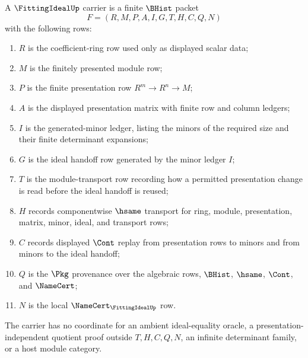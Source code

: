 \begin{definition}
\label{def:fitting-ideal-carrier}
A $\FittingIdealUp$ carrier is a finite $\BHist$ packet
$$
F=(R,M,P,A,I,G,T,H,C,Q,N)
$$
with the following rows:
\begin{enumerate}
\item $R$ is the coefficient-ring row used only as displayed scalar data;
\item $M$ is the finitely presented module row;
\item $P$ is the finite presentation row $R^{m}\to R^{n}\to M$;
\item $A$ is the displayed presentation matrix with finite row and column ledgers;
\item $I$ is the generated-minor ledger, listing the minors of the required size and their finite determinant expansions;
\item $G$ is the ideal handoff row generated by the minor ledger $I$;
\item $T$ is the module-transport row recording how a permitted presentation change is read before the ideal handoff is reused;
\item $H$ records componentwise $\hsame$ transport for ring, module, presentation, matrix, minor, ideal, and transport rows;
\item $C$ records displayed $\Cont$ replay from presentation rows to minors and from minors to the ideal handoff;
\item $Q$ is the $\Pkg$ provenance over the algebraic rows, $\BHist$, $\hsame$, $\Cont$, and $\NameCert$;
\item $N$ is the local $\NameCert_{\FittingIdealUp}$ row.
\end{enumerate}
The carrier has no coordinate for an ambient ideal-equality oracle, a presentation-independent quotient proof outside $T,H,C,Q,N$, an infinite determinant family, or a host module category.
\end{definition}

